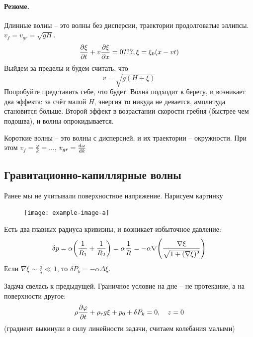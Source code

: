 \paragraph{Резюме.} Длинные волны -- это волны без дисперсии, траектории продолговатые эллипсы. $v_f = v_{gr} = \sqrt{gH}$. 
\begin{equation}
    \pdv{\xi}{t}+v\pdv{\xi}{x} = 0 ???, \xi = \xi_0(x-vt)
\end{equation}
Выйдем за пределы и будем считать, что
\begin{equation}
    v = \sqrt{g(H+\xi)}
\end{equation}
Попробуйте представить себе, что будет. Волна подходит к берегу, и возникает два эффекта: за счёт малой $H$, энергия то никуда не девается, амплитуда становится больше. Второй эффект в возрастании скорости гребня (быстрее чем подошва), и волны опрокидывается. 

Короткие волны -- это волны с дисперсией, и их траектории -- окружности. При этом $v_f = \frac{\omega}{k} = \ldots$, $v_{gr} = \dv{\omega}{k}$

\subsection{Гравитационно-капиллярные волны}
Ранее мы не учитывали поверхностное напряжение. Нарисуем картинку

\begin{figure}[H]
    \centering
    \texttt{[image: example-image-a]}
    \caption{}
    \label{fig:figure1}
\end{figure}

Есть два главных радиуса кривизны, и возникает избыточное давление:
\begin{equation}
    \delta p = \alpha\qty(\frac{1}{R_1}+\frac{1}{R_2}) = \alpha \frac{1}{R} = -\alpha\nabla \qty(\frac{\nabla\xi}{\sqrt{1+(\nabla\xi)^2}})
\end{equation}
Если $\nabla\xi \sim \frac{a}{\lambda} \ll 1$, то $\delta P_k = -\alpha \Delta \xi$.

Задача свелась к предыдущей. Граничное условие на дне -- не протекание, а на поверхности другое:
\begin{equation}
    \rho\pdv{\varphi}{t}+\rho_r g\xi+p_0+\delta P_k = 0, \quad z = 0
\end{equation}
(градиент выкинули в силу линейности задачи, считаем колебания малыми)

